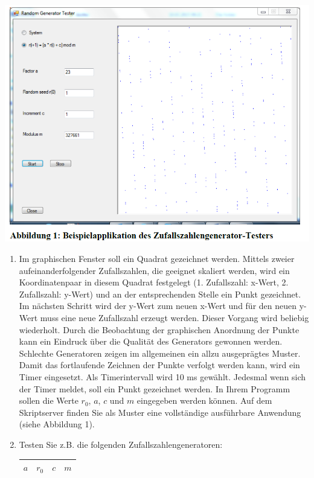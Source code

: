 \includegraphics[width=.8\linewidth]{900-Praktika/prak04/pic2.PNG}
\begin{enumerate}
  \item Im graphischen Fenster soll ein Quadrat gezeichnet werden. Mittels zweier aufeinanderfolgender Zufallszahlen, die geeignet skaliert werden, wird ein Koordinatenpaar in diesem Quadrat festgelegt (1. Zufallszahl: x-Wert, 2. Zufallszahl: y-Wert) und an der entsprechenden Stelle ein Punkt gezeichnet. Im nächsten Schritt wird der y-Wert zum neuen x-Wert und für den neuen y-Wert muss eine neue Zufallszahl erzeugt werden. Dieser Vorgang wird beliebig wiederholt. Durch die Beobachtung der graphischen Anordnung der Punkte kann ein Eindruck über die Qualität des Generators gewonnen werden. Schlechte Generatoren zeigen im allgemeinen ein allzu ausgeprägtes Muster. Damit das fortlaufende Zeichnen der Punkte verfolgt werden kann, wird ein Timer eingesetzt. Als Timerintervall wird 10 ms gewählt. Jedesmal wenn sich der Timer meldet, soll ein Punkt gezeichnet werden. In Ihrem Programm sollen die Werte $r_0$, $a$, $c$ und $m$ eingegeben werden können. Auf dem Skriptserver finden Sie als Muster eine vollständige ausführbare Anwendung (siehe Abbildung 1).
  \item Testen Sie z.B. die folgenden Zufallszahlengeneratoren:

  \begin{center}
           \begin{tabular}{c c c c}
           \hline
           \hline
           \textbf{$a$} &  \textbf{$r_0$} & \textbf{$c$} & \textbf{$m$} \\
           \hline


\end{tabular}
\end{center}
\end{enumerate}
